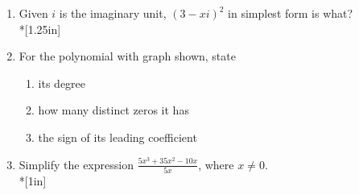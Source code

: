 \documentclass[12pt, oneside]{article}
\begin{document}
\begin{enumerate}
\item Given $i$ is the imaginary unit, $(3-xi)^2$ in simplest form is what?  \\*[1.25in]


\newpage

\item For the polynomial with graph shown, state 
\begin{enumerate}
\item its degree \\[0.25in]
\item how many distinct zeros it has \\[0.25in]
\item the sign of its leading coefficient \\[0.25in]
\end{enumerate}


\item Simplify the expression $\displaystyle \frac{5x^3+35x^2-10x}{5x}$, where $x \neq 0$.  \\*[1in]



\newpage


\end{enumerate}
\end{document}

